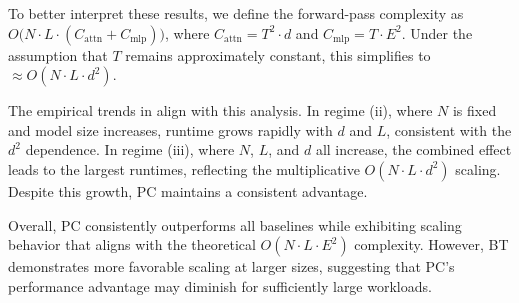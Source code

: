 To better interpret these results, we define the forward-pass complexity as $O\bigl(N \cdot L \cdot (C_{\text{attn}} + C_{\text{mlp}})\bigr)$, where $C_{\text{attn}} = T^{2} \cdot d$ and $C_{\text{mlp}} = T \cdot E^{2}$. 
Under the assumption that $T$ remains approximately constant, this simplifies to $\approx O(N \cdot L \cdot d^{2})$.

The empirical trends in  align with this analysis. In regime (ii), where $N$ is fixed and model size increases, runtime grows rapidly with $d$ and $L$, consistent with the $d^{2}$ dependence. In regime (iii), where $N$, $L$, and $d$ all increase, the combined effect leads to the largest runtimes, reflecting the multiplicative $O(N \cdot L \cdot d^{2})$ scaling. Despite this growth, PC maintains a consistent advantage.

Overall, PC consistently outperforms all baselines while exhibiting scaling behavior that aligns with the theoretical $O(N \cdot L \cdot E^{2})$ complexity. However, BT demonstrates more favorable scaling at larger sizes, suggesting that PC's performance advantage may diminish for sufficiently large workloads.
